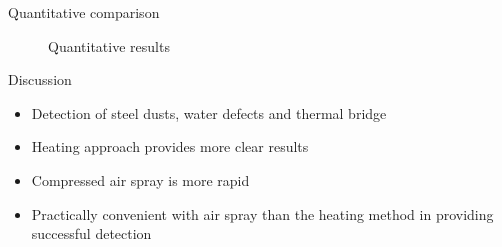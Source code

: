 \begin{frame}{Quantitative comparison}

    \begin{figure}
        \hspace*{-20pt}
        \caption{Quantitative results}

    \end{figure}
\end{frame}


\begin{frame}{Discussion}
    \begin{itemize}[<+->]
    \pause
    \large
        \item Detection of steel dusts, water defects and thermal bridge 
        \item Heating approach provides more clear results
        \item Compressed air spray is more rapid  
        \item Practically convenient with air spray than the heating method in providing successful detection
    \end{itemize}
\end{frame}
